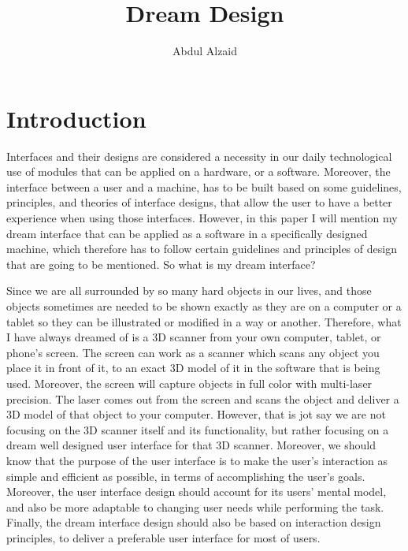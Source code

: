 \documentclass[12pt, oneside]{amsart}   	%
\title{Dream Design}
\author{Abdul Alzaid}
\begin{document}
\maketitle
\section{Introduction}
\doublespacing

Interfaces and their designs are considered a necessity in our daily technological use of modules that can be applied on a hardware, or a software.  Moreover, the interface between a user and a machine, has to be built based on some guidelines, principles, and theories of interface designs, that allow the user to have a better experience when using those interfaces.  However, in this paper I will mention my dream interface that can be applied as a software in a specifically designed machine, which therefore has to follow certain guidelines and principles of design that are going to be mentioned. So what is my dream interface?

Since we are all surrounded by so many hard objects in our lives, and those objects sometimes are needed to be shown exactly as they are on a computer or a tablet so they can be illustrated or modified in a way or another. Therefore, what I have always dreamed of is a 3D scanner from your own computer, tablet, or phone's screen. The screen can work as a scanner which scans any object you place it in front of it, to an exact 3D model of it in the software that is being used. Moreover, the screen will capture objects in full color with multi-laser precision. The laser comes out from the screen and scans the object and deliver a 3D model of that object to your computer. However, that is jot say we are not focusing on the 3D scanner itself and its functionality, but rather focusing on a dream well designed user interface for that 3D scanner. Moreover, we should know that the purpose of the user interface is to make the user's interaction as simple and efficient as possible, in terms of accomplishing the user's goals.  Moreover, the user interface design should account for its users' mental model, and also be more adaptable to changing user needs while performing the task.  Finally, the dream interface design should also be based on interaction design principles, to deliver a preferable user interface for most of users.
\end{document}
